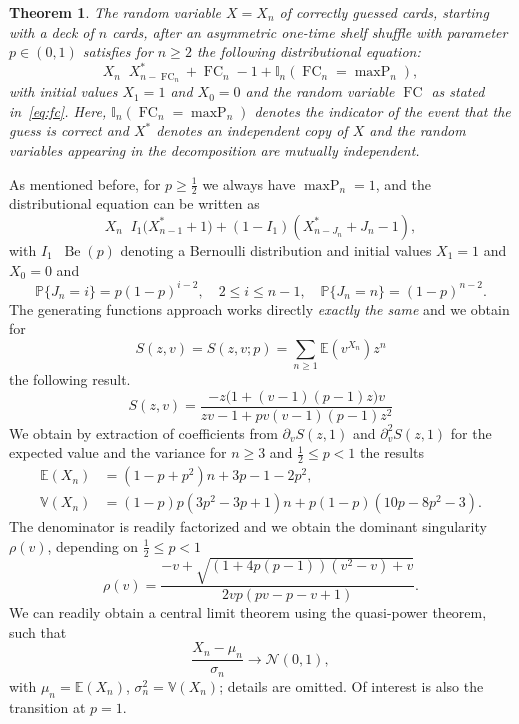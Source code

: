 \documentclass[10pt,reqno,a4paper]{amsart}
\newtheorem{theorem}{Theorem}
\theoremstyle{definition}
\def\P{{\mathbb {P}}}
\def\E{{\mathbb {E}}}
\def\Var{{\mathbb {V}}}
\DeclareMathOperator{\fc}{FC}
\DeclareMathOperator{\law}{\overset{\mathcal{L}}{=}}
\DeclareMathOperator{\Be}{Be}
\DeclareMathOperator{\maxP}{maxP}
\begin{document}
\begin{theorem}
The random variable $X=X_n$ of correctly guessed cards, starting with a deck of $n$ cards, after an asymmetric one-time shelf shuffle with parameter $p \in(0,1)$ satisfies for $n\ge 2$ the following distributional equation:
\begin{equation}
\label{eqn:Xn_DistEqn3}
X_n \law X^{\ast}_{n-\fc_n}+\fc_n-1 + \mathbb{I}_n(\fc_n=\maxP_n), 
\end{equation}
with initial values $X_1=1$ and $X_0=0$ and the random variable $\fc$ as stated in~\eqref{eq:fc}.
Here, $\mathbb{I}_n(\fc_n=\maxP_n)$ denotes the indicator of the event that the guess is correct and $X^{\ast}$ denotes an independent copy of $X$ and the random variables appearing in the decomposition 
are mutually independent.
\end{theorem} 
As mentioned before, for $p\ge \frac12$ we always have $\maxP_n=1$, and the distributional equation can be written as
\begin{equation}
\label{eqn:Xn_DistEqn2}
X_n \law I_1 \big(X^{\ast}_{n-1}+1\big)+(1-I_1)(X^{\ast}_{n-J_n}+J_n-1), 
\end{equation}
with $I_1\law \Be(p)$ denoting a Bernoulli distribution and initial values $X_1=1$ and $X_0=0$ and 
\[
\P\{J_n=i\}=p(1-p)^{i-2},\quad 2\le i\le n-1,\quad \P\{J_n=n\}=(1-p)^{n-2}.
\]
The generating functions approach works directly \emph{exactly the same} and we obtain for 
\[
S(z,v)=S(z,v;p)=\sum_{n\ge 1}\E(v^{X_n})z^n
\]
the following result.
\[
S(z,v)=\frac{-z\big(1 + (v - 1)(p - 1)z\big)v}{zv-1 + pv(v - 1)(p - 1)z^2 }
\]
We obtain by extraction of coefficients from $\partial_v S(z,1)$ and $\partial_v^2 S(z,1)$ for the expected value and the variance for $n\ge 3$ and $\frac12\le p<1$ the results
\begin{align*}
\E(X_n)&=(1-p+p^2)n+3p-1-2p^2,\\
\Var(X_n)&=(1-p)p(3p^2-3p+1)n+p(1-p)(10p-8p^2-3).
\end{align*}
The denominator is readily factorized and we obtain the dominant singularity $\rho(v)$, depending on $\frac12\le p<1$
\[
\rho(v)=%
\frac{-v + \sqrt{(1+4p(p-1))(v^2 - v)+v}}{2vp(pv - p - v + 1)}.
\]
We can readily obtain a central limit theorem using the quasi-power theorem, such that
\[
\frac{X_n-\mu_n}{\sigma_n}\to\mathcal{N}(0,1),
\]
with $\mu_n=\E(X_n)$, $\sigma_n^2=\Var(X_n)$; details are omitted. Of interest is also the transition at $p=1$. 
\end{document}
